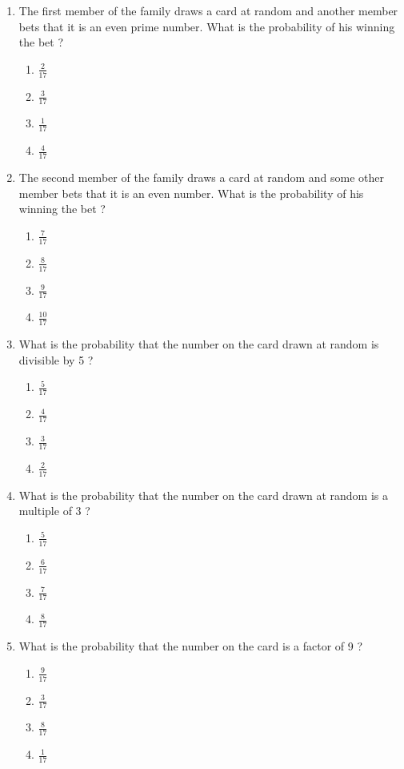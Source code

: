 \documentclass{exam}
\begin{document}
\begin{enumerate}
		\begin{enumerate}
			\item The first member of the family draws a card at random and another member bets that it is an even prime number. What is the probability of his winning the bet ? 
			\begin{enumerate}
				\item $\frac{2}{17}$
				\item $\frac{3}{17}$
				\item $\frac{1}{17}$ 
				\item $\frac{4}{17}$ 
			\end{enumerate}
			\item The second member of the family draws a card at random and some other member bets that it is an even number. What is the probability of his winning the bet ? 
			\begin{enumerate}
				\item $\frac{7}{17}$
				\item $\frac{8}{17}$
				\item $\frac{9}{17}$ 
				\item $\frac{10}{17}$ 
			\end{enumerate}
			\item What is the probability that the number on the card drawn at random is divisible by 5 ? 
			\begin{enumerate}
				\item $\frac{5}{17}$
				\item $\frac{4}{17}$
				\item $\frac{3}{17}$ 
				\item $\frac{2}{17}$ 
			\end{enumerate}
			\item What is the probability that the number on the card drawn at random is a multiple of 3 ? 
			\begin{enumerate}
				\item $\frac{5}{17}$
				\item $\frac{6}{17}$
				\item $\frac{7}{17}$ 
				\item $\frac{8}{17}$ 
			\end{enumerate}
			\item What is the probability that the number on the card is a factor of 9 ?
			\begin{enumerate}
				\item $\frac{9}{17}$
				\item $\frac{3}{17}$
				\item $\frac{8}{17}$ 
				\item $\frac{1}{17}$ 
			\end{enumerate}
		\end{enumerate}
		

\end{enumerate}
\end{document}
